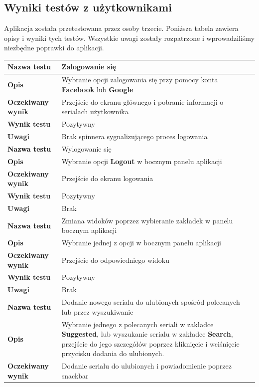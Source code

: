 \documentclass[10pt,a4paper]{article}
\begin{document}
\subsection{Wyniki testów z użytkownikami}
Aplikacja została przetestowana przez osoby trzecie. Poniższa tabela zawiera opisy i wyniki tych testów. Wszystkie uwagi zostały rozpatrzone i wprowadziliśmy niezbędne poprawki do aplikacji.

\begin{tabularx}{\textwidth}{|l|X|}
	\hline
	\textbf{Nazwa testu} & Zalogowanie się \\
	\hline
	\textbf{Opis} & Wybranie opcji zalogowania się przy pomocy konta \textbf{Facebook} lub \textbf{Google} \\
	\hline
	\textbf{Oczekiwany wynik} & Przejście do ekranu głównego i pobranie informacji o serialach użytkownika \\
	\hline
	\textbf{Wynik testu} & Pozytywny \\
	\hline
	\textbf{Uwagi} & Brak spinnera sygnalizującego proces logowania \\
	\hhline{==}
	\textbf{Nazwa testu} & Wylogowanie się \\
	\hline
	\textbf{Opis} & Wybranie opcji \textbf{Logout} w bocznym panelu aplikacji \\
	\hline
	\textbf{Oczekiwany wynik} & Przejście do ekranu logowania \\
	\hline
	\textbf{Wynik testu} & Pozytywny \\
	\hline
	\textbf{Uwagi} & Brak \\
	\hhline{==}
	\textbf{Nazwa testu} & Zmiana widoków poprzez wybieranie zakładek w panelu bocznym aplikacji \\
	\hline
	\textbf{Opis} & Wybranie jednej z opcji w bocznym panelu aplikacji \\
	\hline
	\textbf{Oczekiwany wynik} & Przejście do odpowiedniego widoku \\
	\hline
	\textbf{Wynik testu} & Pozytywny \\
	\hline
	\textbf{Uwagi} & Brak \\
	\hhline{==}
	\textbf{Nazwa testu} & Dodanie nowego serialu do ulubionych spośród polecanych lub przez wyszukiwanie \\
	\hline
	\textbf{Opis} & Wybranie jednego z polecanych seriali w zakładce \textbf{Suggested}, lub wyszukanie serialu w zakładce \textbf{Search}, przejście do jego szczegółów poprzez kliknięcie i wciśnięcie przycisku dodania do ulubionych.  \\
	\hline
	\textbf{Oczekiwany wynik} & Dodanie serialu do ulubionych i powiadomienie poprzez snackbar \\

\end{tabularx}
\end{document}
